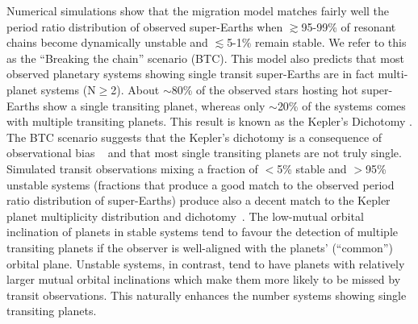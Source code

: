 \documentclass[fleqn,usenatbib]{mnras}
\begin{document}
Numerical simulations show that the migration model matches fairly well the period ratio distribution of observed super-Earths  when  $\gtrsim$95-99\% of resonant chains become dynamically unstable  \citep{izidoro2017breaking,izidoro2019formation} and $\lesssim$5-1\% remain stable. We refer to this as the ``Breaking the chain'' scenario (BTC). This model also predicts that most observed planetary systems showing single transit super-Earths are in fact multi-planet systems (N$\geq$2). About $\sim$80\% of the observed stars hosting hot super-Earths show a single transiting planet, whereas only $\sim$20\% of the systems comes with multiple transiting planets. This result is known as the  Kepler's Dichotomy \citep{johansen2012can}. The BTC scenario suggests that the Kepler's dichotomy is a consequence of observational bias ~\citep{izidoro2017breaking,izidoro2019formation} and that most single transiting planets are not truly single. Simulated transit observations mixing a fraction of  $<$5\% stable and $>$95\% unstable systems (fractions that produce a good match to the observed period ratio distribution of super-Earths) produce also a decent match to the Kepler planet multiplicity distribution and dichotomy~\citep{izidoro2017breaking,izidoro2019formation}. The low-mutual orbital inclination of planets in stable systems tend to favour the detection of multiple transiting planets if the observer is well-aligned with the planets' (``common'') orbital plane.  Unstable systems, in contrast, tend to have  planets with relatively larger mutual orbital inclinations which make them more likely to be missed by transit observations. This naturally enhances  the number systems showing single transiting planets.
\end{document}

